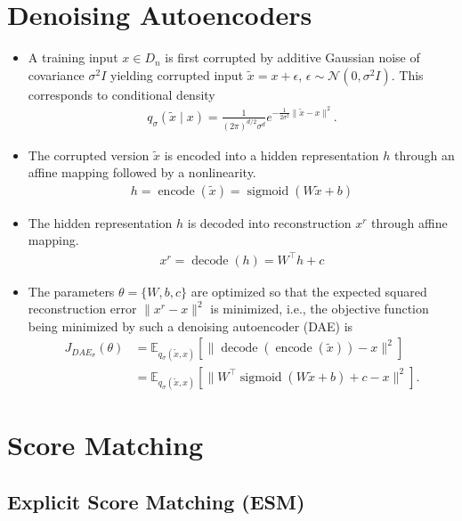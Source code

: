 \documentclass[10pt]{article}
\newcommand{\EE}{\mathbb{E}}
\newcommand{\NN}{\mathcal{N}}
\newcommand{\DAE}{J_{DAE_\sigma}}
\DeclareMathOperator{\encode}{encode}
\DeclareMathOperator{\decode}{decode}
\DeclareMathOperator{\sigmoid}{sigmoid}
\begin{document}
\newpage

\section{Denoising Autoencoders}

\begin{itemize}
\item A training input $x \in D_n$ is first corrupted by additive Gaussian noise of covariance $\sigma^2 I$ yielding corrupted input $\tilde{x} = x + \epsilon$, $\epsilon \sim \NN(0, \sigma^2 I)$. This corresponds to conditional density
\begin{align*}
q_\sigma(\tilde{x} \mid x) = \frac{1}{(2\pi)^{d / 2} \sigma^d} e^{-\frac{1}{2\sigma^2} \|\tilde{x} - x\|^2}.
\end{align*}
\item The corrupted version $\tilde{x}$ is encoded into a hidden representation $h$ through an affine mapping followed by a nonlinearity.
\begin{align*}
h = \encode(\tilde{x}) = \sigmoid(W\tilde{x} + b)
\end{align*}
\item The hidden representation $h$ is decoded into reconstruction $x^r$ through affine mapping.
\begin{align*}
x^r = \decode(h) = W^\top h + c
\end{align*}
\item The parameters $\theta = \{W, b, c\}$ are optimized so that the expected squared reconstruction error $\|x^r - x\|^2$ is minimized, i.e., the objective function being minimized by such a denoising autoencoder (DAE) is
\begin{align*}
\DAE(\theta) &= \EE_{q_\sigma(\tilde{x},x)} [\|\decode(\encode(\tilde{x})) - x\|^2 ] \\
&= \EE_{q_\sigma(\tilde{x},x)} [ \|W^\top \sigmoid( W \tilde{x} + b) + c - x\|^2 ].
\end{align*}
\end{itemize}

\section{Score Matching}

\subsection{Explicit Score Matching (ESM)}
\end{document}
